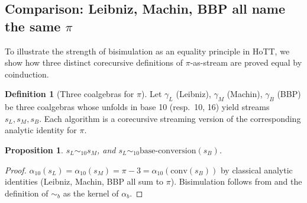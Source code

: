 \documentclass[12pt]{article}
\newtheorem{proposition}[theorem]{Proposition}
\theoremstyle{definition}
\newtheorem{definition}[theorem]{Definition}
\theoremstyle{remark}
\newcommand{\bisim}{\mathrel{\sim}}
\begin{document}
\subsection{\texorpdfstring{Comparison: Leibniz, Machin, BBP all name the same $\pi$}{Comparison: Leibniz, Machin, BBP all name the same pi}}

To illustrate the strength of bisimulation as an equality
principle in HoTT, we show how three distinct corecursive
definitions of $\pi$-as-stream are proved equal by
coinduction.

\begin{definition}[Three coalgebras for $\pi$]\label{def:three-pi}
Let $\gamma_L$ (Leibniz), $\gamma_M$ (Machin), $\gamma_B$ (BBP)
be three coalgebras whose unfolds in base 10 (resp.\ 10, 16)
yield streams $s_L, s_M, s_B$. Each algorithm is a corecursive
streaming version of the corresponding analytic identity for
$\pi$.
\end{definition}

\begin{proposition}\label{prop:three-equal}
$s_L \bisim_{10} s_M$, and
$s_L \bisim_{10} \mathrm{base\text{-}conversion}(s_B)$.
\end{proposition}

\begin{proof}
$\alpha_{10}(s_L) = \alpha_{10}(s_M) = \pi - 3 = \alpha_{10}(\mathrm{conv}(s_B))$
by classical analytic identities (Leibniz, Machin, BBP all sum to
$\pi$). Bisimulation follows from  and
the definition of $\bisim_b$ as the kernel of $\alpha_b$.
\end{proof}
\end{document}

